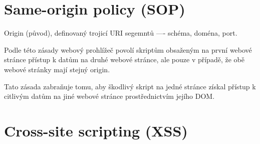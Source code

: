 
\section{Same-origin policy (SOP)}

\begin{compactitem}
    \item Origin (původ), definovaný trojicí URI segemntů ---- schéma, doména, port.

    \item Podle této zásady webový prohlížeč povolí skriptům obsaženým na první webové stránce přístup k datům na druhé webové stránce, ale pouze v případě, že obě webové stránky mají stejný origin.

    \item Tato zásada zabraňuje tomu, aby škodlivý skript na jedné stránce získal přístup k citlivým datům na jiné webové stránce prostřednictvím jejího DOM.

    \item {}

\end{compactitem}


\section{Cross-site scripting (XSS)}

